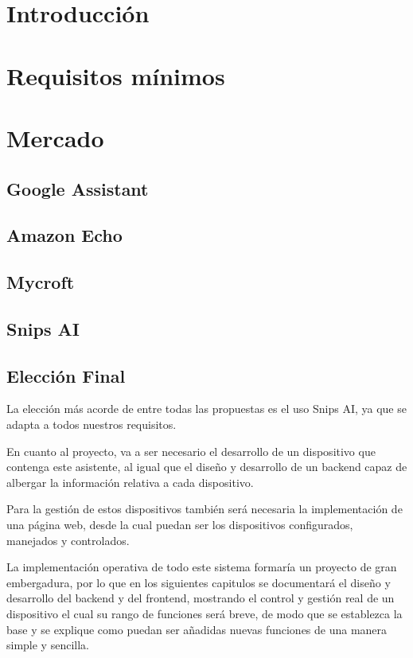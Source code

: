 \section{Introducción}


\section{Requisitos mínimos}


\section{Mercado}
\label{mercato}


    \subsection{Google Assistant}
    
    
    \subsection{Amazon Echo}
    
    
    \subsection{Mycroft}\label{Microft}
    
    
    \subsection{Snips AI}
    
    
    \subsection{Elección Final}

La elección más acorde de entre todas las propuestas es el uso Snips AI, ya que se adapta a todos nuestros requisitos.

En cuanto al proyecto, va a ser necesario el desarrollo de un dispositivo que contenga este asistente, al igual que el diseño y desarrollo de un backend capaz de albergar la información relativa a cada dispositivo.

Para la gestión de estos dispositivos también será necesaria la implementación de una página web, desde la cual puedan ser los dispositivos configurados, manejados y controlados.

La implementación operativa de todo este sistema formaría un proyecto de gran embergadura, por lo que en los siguientes capitulos se documentará el diseño y desarrollo del backend y del frontend, mostrando el control y gestión real de un dispositivo el cual su rango de funciones será breve, de modo que se establezca la base y se explique como puedan ser añadidas nuevas funciones de una manera simple y sencilla.
